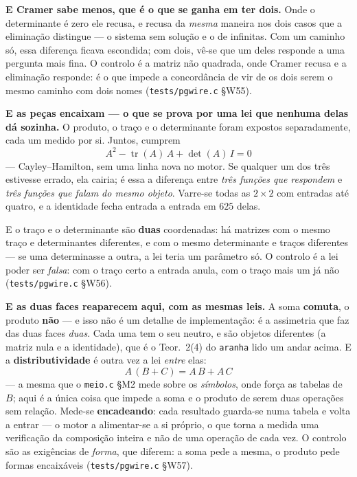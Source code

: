 \documentclass[11pt,a4paper]{article}
\newcommand{\code}[1]{\texttt{\small #1}}
\begin{document}
\medskip\noindent\textbf{E Cramer sabe menos, que é o que se ganha em ter dois.}
Onde o determinante é zero ele recusa, e recusa da \emph{mesma} maneira nos dois
casos que a eliminação distingue --- o sistema sem solução e o de infinitas. Com
um caminho só, essa diferença ficava escondida; com dois, vê-se que um deles
responde a uma pergunta mais fina. O controlo é a matriz não quadrada, onde
Cramer recusa e a eliminação responde: é o que impede a concordância de vir de
os dois serem o mesmo caminho com dois nomes (\code{tests/pgwire.c} §W55).

\medskip\noindent\textbf{E as peças encaixam --- o que se prova por uma lei que
nenhuma delas dá sozinha.} O produto, o traço e o determinante foram expostos
separadamente, cada um medido por si. Juntos, cumprem
\[
\boxed{\;A^{2}-\operatorname{tr}(A)\,A+\det(A)\,I=0\;}
\]
--- Cayley--Hamilton, sem uma linha nova no motor. Se qualquer um dos três
estivesse errado, ela cairia; é essa a diferença entre \emph{três funções que
respondem} e \emph{três funções que falam do mesmo objeto}. Varre-se todas as
$2\times2$ com entradas até quatro, e a identidade fecha entrada a entrada em
$625$ delas.

\medskip\noindent E o traço e o determinante são \textbf{duas} coordenadas: há
matrizes com o mesmo traço e determinantes diferentes, e com o mesmo
determinante e traços diferentes --- se uma determinasse a outra, a lei teria um
parâmetro só. O controlo é a lei poder ser \emph{falsa}: com o traço certo a
entrada anula, com o traço mais um já não (\code{tests/pgwire.c} §W56).

\medskip\noindent\textbf{E as duas faces reaparecem aqui, com as mesmas leis.} A
soma \textbf{comuta}, o produto \textbf{não} --- e isso não é um detalhe de
implementação: é a assimetria que faz das duas faces \emph{duas}. Cada uma tem o
seu neutro, e são objetos diferentes (a matriz nula e a identidade), que é o
Teor.~2(4) do \code{aranha} lido um andar acima. E a
\textbf{distributividade} é outra vez a lei \emph{entre} elas:
\[
A\,(B+C)=A\,B+A\,C
\]
--- a mesma que o \code{meio.c} §M2 mede sobre os \emph{símbolos}, onde força as
tabelas de $B$; aqui é a única coisa que impede a soma e o produto de serem duas
operações sem relação. Mede-se \textbf{encadeando}: cada resultado guarda-se numa
tabela e volta a entrar --- o motor a alimentar-se a si próprio, o que torna a
medida uma verificação da composição inteira e não de uma operação de cada vez.
O controlo são as exigências de \emph{forma}, que diferem: a soma pede a mesma,
o produto pede formas encaixáveis (\code{tests/pgwire.c} §W57).
\end{document}
